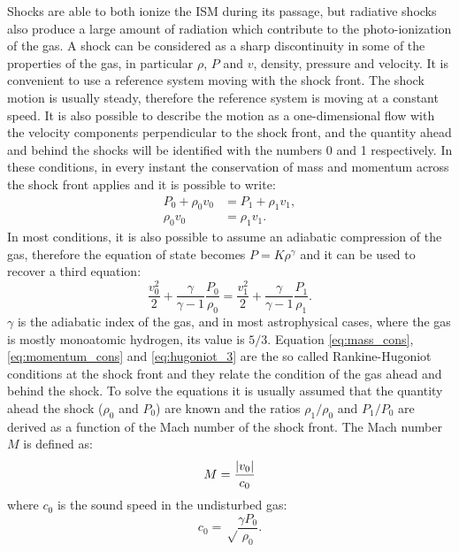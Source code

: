 \documentclass[../main.tex]{subfiles}
\begin{document}
Shocks are able to both ionize the ISM during its passage, but radiative shocks also produce a large amount of radiation which contribute to the photo-ionization of the gas.
A shock can be considered as a sharp discontinuity in some of the properties of the gas, in particular $\rho$, $P$ and $v$, density, pressure and velocity.
It is convenient to use a reference system moving with the shock front.
The shock motion is usually steady, therefore the reference system is moving at a constant speed.
It is also possible to describe the motion as a one-dimensional flow with the velocity components perpendicular to the shock front, and the quantity ahead and behind the shocks will be identified with the numbers 0 and 1 respectively.
In these conditions, in every instant the conservation of mass and momentum across the shock front applies and it is possible to write:
\begin{align}
    \label{eq:mass_cons}
    P_0 + \rho_0 v_0 &= P_1+\rho_1 v_1,\\
    \label{eq:momentum_cons}
    \rho_0 v_0 &= \rho_1 v_1.
\end{align}
In most conditions, it is also possible to assume an adiabatic compression of the gas, therefore the equation of state becomes $P = K \rho^{\gamma}$ and it can be used to recover a third equation:
\begin{equation}
    \label{eq:hugoniot_3}
    \frac{v^2_0}{2} + \frac{\gamma}{\gamma-1}\frac{P_0}{\rho_0} = \frac{v^2_1}{2} + \frac{\gamma}{\gamma-1}\frac{P_1}{\rho_1}.
\end{equation}
$\gamma$ is the adiabatic index of the gas, and in most astrophysical cases, where the gas is mostly monoatomic hydrogen, its value is $5/3$.
Equation \ref{eq:mass_cons}, \ref{eq:momentum_cons} and \ref{eq:hugoniot_3} are the so called Rankine-Hugoniot conditions at the shock front and they relate the condition of the gas ahead and behind the shock.
To solve the equations it is usually assumed that the quantity ahead the shock ($\rho_0$ and $P_0$) are known and the ratios $\rho_1/\rho_0$ and $P_1/P_0$ are derived as a function of the Mach number of the shock front.
The Mach number $M$ is defined as:
\begin{equation}
    \label{eq:mach}
    M = \frac{\lvert v_0\rvert}{c_0}
\end{equation}
where $c_0$ is the sound speed in the undisturbed gas:
\begin{equation}
    \label{eq:soundspeed}
    c_0 = \sqrt\frac{\gamma P_0}{\rho_0}.
\end{equation}
\end{document}
